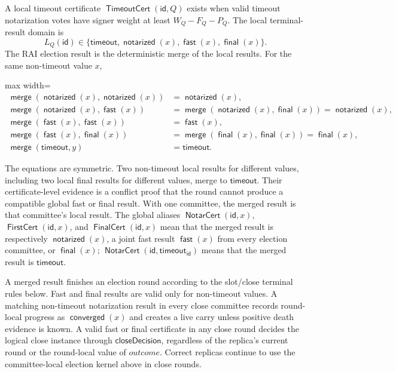\documentclass[sigplan,twocolumn,review,anonymous]{acmart}
\newcommand{\func}[1]{\operatorname{\mathsf{#1}}}
\newcommand{\NotarCert}{\func{NotarCert}}
\newcommand{\FirstCert}{\func{FirstCert}}
\newcommand{\FinalCert}{\func{FinalCert}}
\newcommand{\TimeoutCert}{\func{TimeoutCert}}
\newcommand{\id}{\mathsf{id}}
\newcommand{\closeDecision}{\mathsf{closeDecision}}
\newcommand{\timeoutVal}{\mathsf{timeout}}
\newcommand{\timeoutOutcome}{\mathsf{timeout}}
\newcommand{\notarized}{\func{notarized}}
\newcommand{\converged}{\func{converged}}
\newcommand{\fast}{\func{fast}}
\newcommand{\final}{\func{final}}
\begin{document}
A local timeout certificate \(\TimeoutCert(\id,Q)\) exists when valid timeout notarization votes have
signer weight at least \(W_Q-F_Q-P_Q\).  The local terminal-result domain is
\[
L_Q(\id)\in\{\timeoutOutcome,\notarized(x),\fast(x),\final(x)\}.
\]
The RAI election result is the deterministic merge of the local results.  For the same non-timeout
value \(x\),
\begin{center}
\begin{adjustbox}{max width=\columnwidth}
\(\displaystyle
\begin{aligned}
\func{merge}(\notarized(x),\notarized(x))&=\notarized(x),\\
\func{merge}(\notarized(x),\fast(x))&=\func{merge}(\notarized(x),\final(x))=\notarized(x),\\
\func{merge}(\fast(x),\fast(x))&=\fast(x),\\
\func{merge}(\fast(x),\final(x))&=\func{merge}(\final(x),\final(x))=\final(x),\\
\func{merge}(\timeoutOutcome,y)&=\timeoutOutcome.
\end{aligned}
\)
\end{adjustbox}
\end{center}
The equations are symmetric.  Two non-timeout local results for different values, including two local
final results for different values, merge to \(\timeoutOutcome\).  Their certificate-level evidence is a
conflict proof that the round cannot produce a compatible global fast or final result.  With one
committee, the merged result is that committee's local result.  The global aliases
\(\NotarCert(\id,x)\), \(\FirstCert(\id,x)\), and \(\FinalCert(\id,x)\) mean that the merged result
is respectively \(\notarized(x)\), a joint fast result \(\fast(x)\) from every election committee, or
\(\final(x)\); \(\NotarCert(\id,\timeoutVal_\id)\) means that the merged result is
\(\timeoutOutcome\).

A merged result finishes an election round according to the slot/close terminal rules below.
Fast and final results are valid only for non-timeout values.  A matching non-timeout notarization
result in every close committee records round-local progress as \(\converged(x)\) and creates a live
carry unless positive death evidence is known.  A valid fast or final certificate in any close round
decides the logical close instance through \(\closeDecision\), regardless of the replica's current
round or the round-local value of \(outcome\).  Correct replicas continue to use the committee-local
election kernel above in close rounds.
\end{document}
